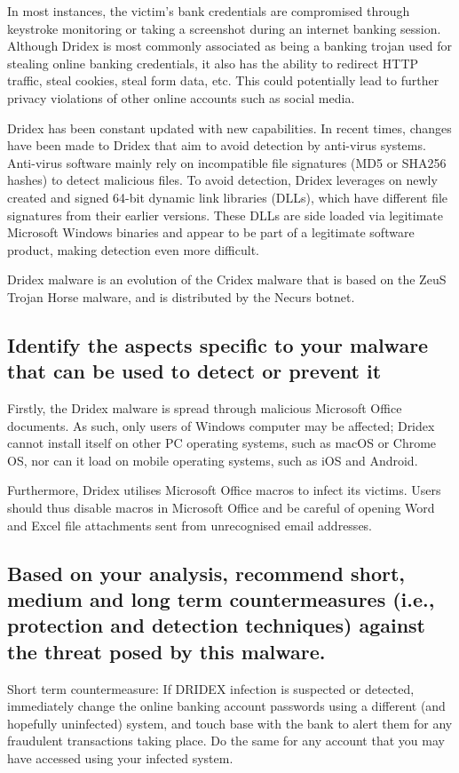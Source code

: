 \documentclass[conference]{IEEEtran}
\begin{document}
In most instances, the victim's bank credentials are compromised through keystroke monitoring or taking a screenshot during an internet banking session. Although Dridex is most commonly associated as being a banking trojan used for stealing online banking credentials, it also has the ability to redirect HTTP traffic, steal cookies, steal form data, etc. This could potentially lead to further privacy violations of other online accounts such as social media.

Dridex has been constant updated with new capabilities. In recent times, changes have been made to Dridex that aim to avoid detection by anti-virus systems. Anti-virus software mainly rely on incompatible file signatures (MD5 or SHA256 hashes) to detect malicious files. To avoid detection, Dridex leverages on newly created and signed 64-bit dynamic link libraries (DLLs), which have different file signatures from their earlier versions. These DLLs are side loaded via legitimate Microsoft Windows binaries and appear to be part of a legitimate software product, making detection even more difficult.

Dridex malware is an evolution of the Cridex malware that is based on the ZeuS Trojan Horse malware, and is distributed by the Necurs botnet. 

\subsection{Identify the aspects specific to your malware that can be used to detect or prevent it}
Firstly, the Dridex malware is spread through malicious Microsoft Office documents. As such, only users of Windows computer may be affected; Dridex cannot install itself on other PC operating systems, such as macOS or Chrome OS, nor can it load on mobile operating systems, such as iOS and Android. 
 
Furthermore, Dridex utilises Microsoft Office macros to infect its victims. Users should thus disable macros in Microsoft Office and be careful of opening Word and Excel file attachments sent from unrecognised email addresses.

\subsection{Based on your analysis, recommend short, medium and long term countermeasures (i.e., protection and detection techniques) against the threat posed by this malware.}
Short term countermeasure: 
If DRIDEX infection is suspected or detected, immediately change the online banking account passwords using a different (and hopefully uninfected) system, and touch base with the bank to alert them for any fraudulent transactions taking place. Do the same for any account that you may have accessed using your infected system.
 
\end{document}
